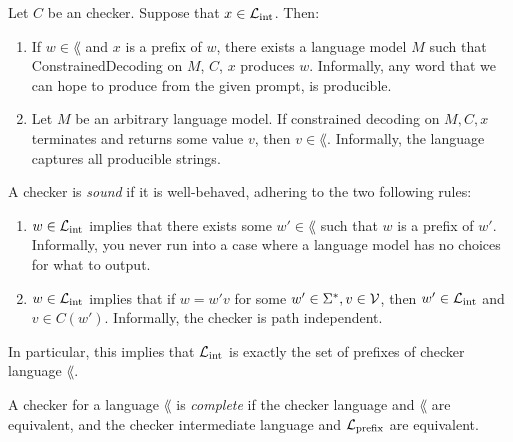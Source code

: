 \begin{theorem}
    \label{def:CheckerLanguageCorrect}
    Let $C$ be an checker. Suppose that $x \in \mathcal{L}_{\mathrm{int}}$. Then: 
    \begin{enumerate}
        \item If $w \in \lang$ and $x$ is a prefix of $w$, there exists a language model $M$ such that ConstrainedDecoding on $M$, $C$, $x$ produces $w$. Informally, any word that we can hope to produce from the given prompt, is producible.
        \item Let $M$ be an arbitrary language model. If constrained decoding on $M, C, x$ terminates and returns some value $v$, then $v \in \lang$. Informally, the language captures all producible strings.
    \end{enumerate}
\end{theorem}

\begin{definition}
    \label{def:CheckerSound}
    A checker is \emph{sound} if it is well-behaved, adhering to the two following rules:

    \begin{enumerate}
        \item $w \in \mathcal{L}_{\mathrm{int}}$ implies that there exists some $w' \in \lang$ such that $w$ is a prefix of $w'$. Informally, you never run into a case where a language model has no choices for what to output.
        \item $w \in \mathcal{L}_{\mathrm{int}}$ implies that if $w = w'v$ for some $w' \in \Sigma^*, v \in \mathcal{V}$, then $w' \in \mathcal{L}_{\mathrm{int}}$ and $v \in C(w')$. Informally, the checker is path independent.
    \end{enumerate}

    In particular, this implies that $\mathcal{L}_{\mathrm{int}}$ is exactly the set of prefixes of checker language $\lang$.
\end{definition}

\begin{definition}
    \label{def:CheckerComplete}
    A checker for a language $\lang$ is \emph{complete} if the checker language and $\lang$ are equivalent, and the checker intermediate language and $\mathcal{L}_{\mathrm{prefix}}$ are equivalent. 
\end{definition}


